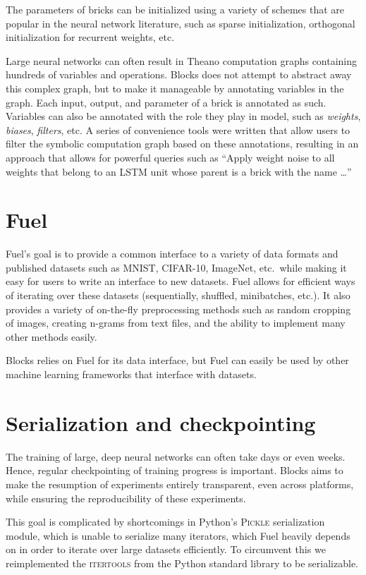\documentclass[twoside,11pt]{article}
\begin{document}
The parameters of bricks can be initialized using a variety of schemes that are
popular in the neural network literature, such as sparse initialization,
orthogonal initialization for recurrent weights, etc.

Large neural networks can often result in Theano computation graphs containing
hundreds of variables and operations. Blocks does not attempt to abstract away
this complex graph, but to make it manageable by annotating variables in the
graph. Each input, output, and parameter of a brick is annotated as such.
Variables can also be annotated with the role they play in model, such as
\emph{weights}, \emph{biases}, \emph{filters}, etc. A series of convenience
tools were written that allow users to filter the symbolic computation graph
based on these annotations, resulting in an approach that allows for powerful
queries such as ``Apply weight noise to all weights that belong to an LSTM
unit whose parent is a brick with the name \ldots''

\section{Fuel}

Fuel's goal is to provide a common interface to a variety of data formats and
published datasets such as MNIST, CIFAR-10, ImageNet, etc.\ while making it easy
for users to write an interface to new datasets. Fuel allows for efficient ways
of iterating over these datasets (sequentially, shuffled, minibatches, etc.).
It also provides a variety of on-the-fly preprocessing methods such as random
cropping of images, creating n-grams from text files, and the ability to
implement many other methods easily.

Blocks relies on Fuel for its data interface, but Fuel can easily be used by
other machine learning frameworks that interface with datasets.

\section{Serialization and checkpointing}

The training of large, deep neural networks can often take days or even weeks.
Hence, regular checkpointing of training progress is important. Blocks aims to
make the resumption of experiments entirely transparent, even across platforms,
while ensuring the reproducibility of these experiments.

This goal is complicated by shortcomings in Python's \textsc{Pickle}
serialization module, which is unable to serialize many iterators, which Fuel
heavily depends on in order to iterate over large datasets efficiently. To
circumvent this we reimplemented the \textsc{itertools} from the Python
standard library to be serializable.
\end{document}
